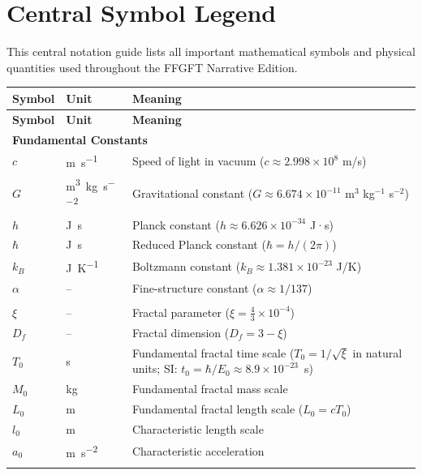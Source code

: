 
\chapter*{Central Symbol Legend}

This central notation guide lists all important mathematical symbols and physical quantities used throughout the FFGFT Narrative Edition.

\begin{longtable}{@{}p{}p{}p{}@{}}
  \toprule
  \textbf{Symbol} & \textbf{Unit} & \textbf{Meaning} \\
  \midrule
  \endfirsthead
  
  \toprule
  \textbf{Symbol} & \textbf{Unit} & \textbf{Meaning} \\
  \midrule
  \endhead
  
  \multicolumn{3}{l}{\textbf{Fundamental Constants}} \\
  \midrule
  $c$ & \si{\meter\per\second} & Speed of light in vacuum ($c \approx 2.998 \times 10^8$ m/s) \\
  $G$ & \si{\meter\cubed\per\kilo\gram\per\second\squared} & Gravitational constant ($G \approx 6.674 \times 10^{-11}$ m$^3$ kg$^{-1}$ s$^{-2}$) \\
  $h$ & \si{\joule\second} & Planck constant ($h \approx 6.626 \times 10^{-34}$ J·s) \\
  $\hbar$ & \si{\joule\second} & Reduced Planck constant ($\hbar = h/(2\pi)$) \\
  $k_B$ & \si{\joule\per\kelvin} & Boltzmann constant ($k_B \approx 1.381 \times 10^{-23}$ J/K) \\
  $\alpha$ & -- & Fine-structure constant ($\alpha \approx 1/137$) \\
  \addlinespace
  
  \multicolumn{3}{l}{\textbf{FFGFT-Specific Quantities}} \\
  \midrule
  $\xi$ & -- & Fractal parameter ($\xi = \frac{4}{3} \times 10^{-4}$) \\
  $D_f$ & -- & Fractal dimension ($D_f = 3 - \xi$) \\
  $T_0$ & \si{\second} & Fundamental fractal time scale ($T_0 = 1/\sqrt{\xi}$ in natural units; SI: $t_0 = \hbar/E_0 \approx 8.9 \times 10^{-23}$~s) \\
  $M_0$ & \si{\kilo\gram} & Fundamental fractal mass scale \\
  $L_0$ & \si{\meter} & Fundamental fractal length scale ($L_0 = c T_0$) \\
  $l_0$ & \si{\meter} & Characteristic length scale \\
  $a_0$ & \si{\meter\per\second\squared} & Characteristic acceleration \\
  \addlinespace
  

\end{longtable}
